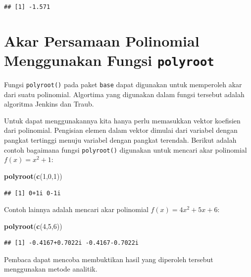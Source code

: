 \documentclass[
]{book}
\newenvironment{Shaded}{\begin{snugshade}}{\end{snugshade}}
\newcommand{\DecValTok}[1]{\textcolor[rgb]{0.00,0.00,0.81}{#1}}
\newcommand{\FunctionTok}[1]{\textcolor[rgb]{0.13,0.29,0.53}{\textbf{#1}}}
\newcommand{\NormalTok}[1]{#1}
\theoremstyle{definition}
\theoremstyle{definition}
\theoremstyle{definition}
\theoremstyle{definition}
\theoremstyle{remark}
\begin{document}
\begin{verbatim}
## [1] -1.571
\end{verbatim}

\hypertarget{akar-persamaan-polinomial-menggunakan-fungsi-polyroot}{%
\section{\texorpdfstring{Akar Persamaan Polinomial Menggunakan Fungsi \texttt{polyroot}}{Akar Persamaan Polinomial Menggunakan Fungsi polyroot}}\label{akar-persamaan-polinomial-menggunakan-fungsi-polyroot}}

Fungsi \texttt{polyroot()} pada paket \texttt{base} dapat digunakan untuk memperoleh akar dari suatu polinomial. Algortima yang digunakan dalam fungsi tersebut adalah algoritma Jenkins dan Traub.

Untuk dapat menggunakannya kita hanya perlu memasukkan vektor koefisien dari polinomial. Pengisian elemen dalam vektor dimulai dari variabel dengan pangkat tertinggi menuju variabel dengan pangkat terendah. Berikut adalah contoh bagaimana fungsi \texttt{polyroot()} digunakan untuk mencari akar polinomial \(f\left(x\right)=x^2+1\):

\begin{Shaded}
\begin{Highlighting}[]
\FunctionTok{polyroot}\NormalTok{(}\FunctionTok{c}\NormalTok{(}\DecValTok{1}\NormalTok{,}\DecValTok{0}\NormalTok{,}\DecValTok{1}\NormalTok{))}
\end{Highlighting}
\end{Shaded}

\begin{verbatim}
## [1] 0+1i 0-1i
\end{verbatim}

Contoh lainnya adalah mencari akar polinomial \(f\left(x\right)=4x^2+5x+6\):

\begin{Shaded}
\begin{Highlighting}[]
\FunctionTok{polyroot}\NormalTok{(}\FunctionTok{c}\NormalTok{(}\DecValTok{4}\NormalTok{,}\DecValTok{5}\NormalTok{,}\DecValTok{6}\NormalTok{))}
\end{Highlighting}
\end{Shaded}

\begin{verbatim}
## [1] -0.4167+0.7022i -0.4167-0.7022i
\end{verbatim}

Pembaca dapat mencoba membuktikan hasil yang diperoleh tersebut menggunakan metode analitik.
\end{document}
